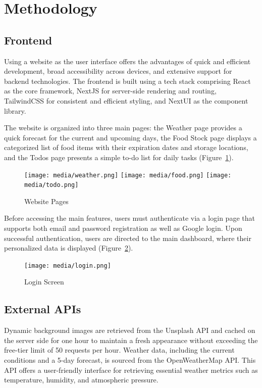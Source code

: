 
\section{Methodology}\label{sec:Methodology}
\subsection{Frontend}
Using a website as the user interface offers the advantages of quick and efficient development, broad accessibility across devices, and extensive support for backend technologies. The frontend is built using a tech stack comprising React as the core framework, NextJS for server-side rendering and routing, TailwindCSS for consistent and efficient styling, and NextUI as the component library.

The website is organized into three main pages: the Weather page provides a quick forecast for the current and upcoming days, the Food Stock page displays a categorized list of food items with their expiration dates and storage locations, and the Todos page presents a simple to-do list for daily tasks (Figure~\ref{fig:website}).

\begin{figure}[H]
\texttt{[image: media/weather.png]}
\texttt{[image: media/food.png]}
\texttt{[image: media/todo.png]}
\caption{Website Pages}
\label{fig:website}
\end{figure}

Before accessing the main features, users must authenticate via a login page that supports both email and password registration as well as Google login. Upon successful authentication, users are directed to the main dashboard, where their personalized data is displayed (Figure~\ref{fig:login}).

\begin{figure}[H]
\centering
\texttt{[image: media/login.png]}
\caption{Login Screen}
\label{fig:login}
\end{figure}

\subsection{External APIs}
Dynamic background images are retrieved from the Unsplash API and cached on the server side for one hour to maintain a fresh appearance without exceeding the free-tier limit of 50 requests per hour. Weather data, including the current conditions and a 5-day forecast, is sourced from the OpenWeatherMap API. This API offers a user-friendly interface for retrieving essential weather metrics such as temperature, humidity, and atmospheric pressure.

